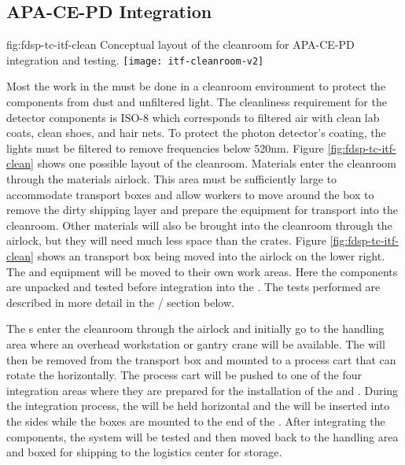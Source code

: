 \subsection{APA-CE-PD Integration}
\label{sec:fdsp-tc-itf-integ}

\begin{dunefigure}{fig:fdsp-tc-itf-clean}
{Conceptual layout of the cleanroom for APA-CE-PD integration and testing.}
\texttt{[image: itf-cleanroom-v2]}
\end{dunefigure}

Most the work in the  must be done in a cleanroom environment to protect the components from dust and unfiltered light. The cleanliness requirement for the detector components is ISO-8 which corresponds to filtered air with clean lab coats, clean shoes, and hair nets. 
To protect the photon detector's  coating, the lights must be filtered to remove frequencies below 520nm.\cite{LBNE-docdb-8348} Figure \ref{fig:fdsp-tc-itf-clean} shows one possible layout of the cleanroom.
Materials enter the  cleanroom through the materials airlock. This area must be sufficiently large to accommodate  transport boxes and allow workers to move around the box to remove the dirty shipping layer and prepare the equipment for transport into the cleanroom. 
Other materials will also be brought into the cleanroom through the airlock, but they will need much less space than the  crates. Figure \ref{fig:fdsp-tc-itf-clean} shows an  transport box being moved into the airlock on the lower right.
The  and  equipment will be moved to their own work areas. 
Here the components are unpacked and tested before integration into the . 
The tests performed are described in more detail in the / section below. 

The s enter the cleanroom through the airlock and initially go to the  handling area where an overhead workstation or gantry crane will be available. 
The  will then be removed from the transport box and mounted to a process cart that can rotate the  horizontally. The process cart will be pushed to one of the four  integration areas where they are prepared for the installation of the  and . 
During the integration process, the  will be held horizontal and the  will be inserted into the sides while the  boxes are mounted to the end of the . 
After integrating the components, the system will be tested and then moved back to the handling area and boxed for shipping to the logistics center for storage.  

